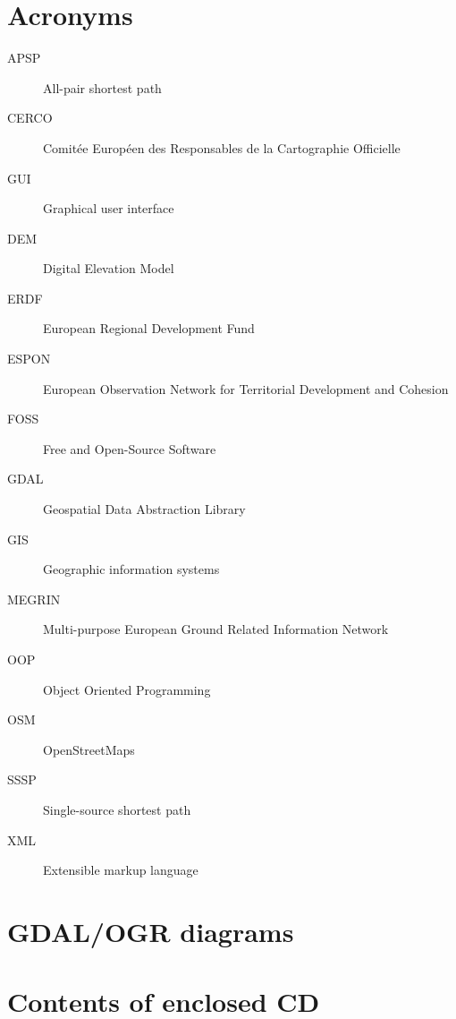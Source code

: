 \documentclass[thesis=M,english]{FITthesis}[2012/10/20]
\begin{document}
\chapter{Acronyms}
\begin{description}
	\item[APSP] All-pair shortest path
	\item[CERCO] Comit{\' e}e Europ{\' e}en des Responsables de la Cartographie Officielle\item[GUI] Graphical user interface
	\item[DEM] Digital Elevation Model
	\item[ERDF] European Regional Development Fund
	\item[ESPON] European Observation Network for Territorial Development and Cohesion
	\item[FOSS] Free and Open-Source Software
	\item[GDAL] Geospatial Data Abstraction Library
	\item[GIS] Geographic information systems	
	\item[MEGRIN] Multi-purpose European Ground Related Information Network
	\item[OOP] Object Oriented Programming
	\item[OSM] OpenStreetMaps
	\item[SSSP] Single-source shortest path
	\item[XML] Extensible markup language
	
	
\end{description}

\chapter{GDAL/OGR diagrams}



\chapter{Contents of enclosed CD}


\begin{figure}
\end{figure}
\end{document}
